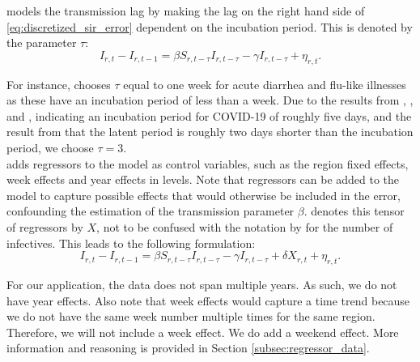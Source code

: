 \documentclass[12pt]{article}
\begin{document}
	\textcite{adda2016economic} models the transmission lag by making the lag on the right hand side of \eqref{eq:discretized_sir_error} dependent on the incubation period. This is denoted by the parameter $\tau$:
	    \begin{equation}\label{eq:discretized_sir_tau}
	        I_{r,t} - I_{r,t-1} = \beta S_{r,t-\tau}I_{r,t-\tau} - \gamma I_{r,t-\tau} + \eta_{r,t}.
	    \end{equation}
	
	For instance, \textcite{adda2016economic} chooses $\tau$ equal to one week for acute diarrhea and flu-like illnesses as these have an incubation period of less than a week. Due to the results from \textcite{lauer2020incubation}, \textcite{li2020incubation}, and \textcite{linton2020incubation}, indicating an incubation period for COVID-19 of roughly five days, and the result from \textcite{he2020temporal} that the latent period is roughly two days shorter than the incubation period, we choose $\tau = 3$. \\
	
	\textcite{adda2016economic} adds regressors to the model as control variables, such as the region fixed effects, week effects and year effects in levels. Note that regressors can be added to the model to capture possible effects that would otherwise be included in the error, confounding the estimation of the transmission parameter $\beta$. \textcite{adda2016economic} denotes this tensor of regressors by $X$, not to be confused with the notation by \textcite{keeling2011modeling} for the number of infectives. This leads to the following formulation:
	    \begin{equation}\label{eq:discretized_sir_regressors}
        	I_{r,t} - I_{r,t-1} = \beta S_{r,t-\tau}I_{r,t-\tau} - \gamma I_{r,t-\tau} + \delta X_{r,t} + \eta_{r,t}.
    	\end{equation}
    	
	For our application, the data does not span multiple years. As such, we do not have year effects. Also note that week effects would capture a time trend because we do not have the same week number multiple times for the same region. Therefore, we will not include a week effect. We do add a weekend effect. More information and reasoning is provided in Section \ref{subsec:regressor_data}. \\
	
\end{document}
